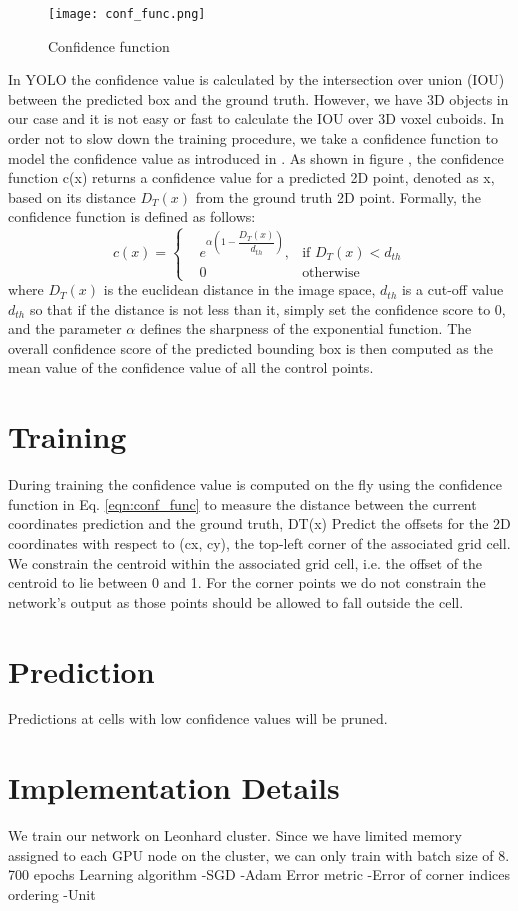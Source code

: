 \begin{figure}
\centering
  \texttt{[image: conf\_func.png]}
  \caption{Confidence function}
  \label{fig:conf_func}
\end{figure}
In YOLO the confidence value is calculated by the intersection over union (IOU) between the predicted box and the ground truth. However, we have 3D objects in our case and it is not easy or fast to calculate the IOU over 3D voxel cuboids. In order not to slow down the training procedure, we take a confidence function to model the confidence value as introduced in \cite{tekin2018real}. As shown in figure , the confidence function c(x) returns a confidence value for a predicted 2D point, denoted as x, based on its distance $ D_{T}(x) $ from the ground truth 2D point. Formally, the confidence function is defined as follows:
\begin{equation}
\label{eqn:conf_func}
c(x)=\left\{
\begin{aligned}
&e^{\alpha(1-\dfrac{D_{T}(x)}{d_{th}})}, &\text{if } D_{T}(x) < d_{th}\\
&0 &\text{otherwise}
\end{aligned}
\right.
\end{equation}
where $ D_{T}(x) $ is the euclidean distance in the image space, $ d_{th} $ is a cut-off value $ d_{th} $ so that if the distance is not less than it, simply set the confidence score to 0, and the parameter $ \alpha $ defines the sharpness of the exponential function. The overall confidence score of the predicted bounding box is then computed as the mean value of the confidence value of all the control points.

\section{Training}
During training the confidence value is computed on the fly using the confidence function in Eq. \ref{eqn:conf_func} to measure the distance between the current coordinates prediction and the ground truth, DT(x)
Predict the offsets for the 2D coordinates with respect to (cx, cy), the top-left corner of the associated grid cell.
We constrain the centroid within the associated grid cell, i.e. the offset of the centroid to lie between 0 and 1. For the corner points we do not constrain the network’s output as those points should be allowed to fall outside the cell.

\section{Prediction}
Predictions at cells with low confidence values will be pruned.

\section{Implementation Details}

We train our network on Leonhard cluster. Since we have limited memory assigned to each GPU node  on the cluster, we can only train with batch size of 8.
700 epochs
Learning algorithm
-SGD
-Adam
Error metric
-Error of corner indices ordering
-Unit

